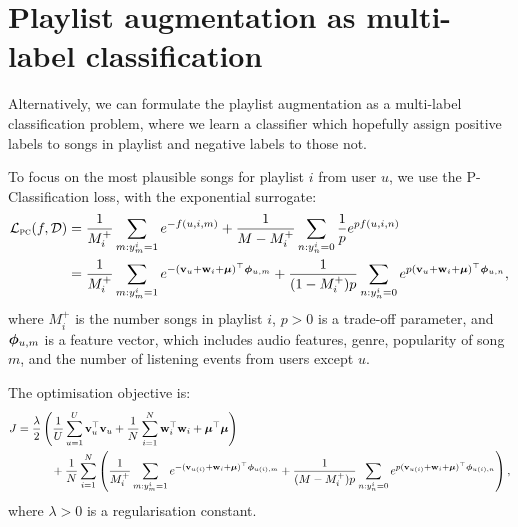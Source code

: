 \section{Playlist augmentation as multi-label classification}

Alternatively, we can formulate the playlist augmentation as a multi-label classification problem,
where we learn a classifier which hopefully assign positive labels to songs in playlist and negative labels to those not.

To focus on the most plausible songs for playlist $i$ from user $u$,
we use the P-Classification loss, with the exponential surrogate:
\begin{equation*}
\begin{aligned}
\mathcal{L}_\textsc{pc}(f, \mathcal{D}) 
&= \frac{1}{M_i^+} \sum_{m: y_m^i = 1} e^{-f(u, i, m)} + \frac{1}{M - M_i^+} \sum_{n: y_n^i = 0} \frac{1}{p} e^{p f(u, i, n)} \\
&= \frac{1}{M_i^+} \sum_{m: y_m^i = 1} e^{-(\mathbf{v}_u + \mathbf{w}_i + \bm{\mu})^\top \bm{\phi}_{u,m}} 
   + \frac{1}{(1 - M_i^+) p} \sum_{n: y_n^i = 0} e^{p (\mathbf{v}_u + \mathbf{w}_i + \bm{\mu})^\top \bm{\phi}_{u,n}},
\end{aligned}
\end{equation*}
where $M_i^+$ is the number songs in playlist $i$,
$p > 0$ is a trade-off parameter,
and $\bm{\phi}_{u,m}$ is a feature vector,
which includes audio features, genre, popularity of song $m$,
and the number of listening events from users except $u$.

The optimisation objective is:
\begin{equation*}
\begin{aligned}
J &= \frac{\lambda}{2} \left( \frac{1}{U} \sum_{u=1}^U \mathbf{v}_u^\top \mathbf{v}_u 
     + \frac{1}{N} \sum_{i=1}^N \mathbf{w}_i^\top \mathbf{w}_i + \bm{\mu}^\top \bm{\mu} \right) \\
& \hspace{3em}
     + \frac{1}{N} \sum_{i=1}^N \left( \frac{1}{M_i^+} \sum_{m: y_m^i = 1} e^{-(\mathbf{v}_{u(i)} + \mathbf{w}_i + \bm{\mu})^\top \bm{\phi}_{u(i),m}} 
     + \frac{1}{(M - M_i^+) p} \sum_{n: y_n^i = 0} e^{p (\mathbf{v}_{u(i)} + \mathbf{w}_i + \bm{\mu})^\top \bm{\phi}_{u(i),n}} \right),
\end{aligned}
\end{equation*}
where $\lambda > 0$ is a regularisation constant.

